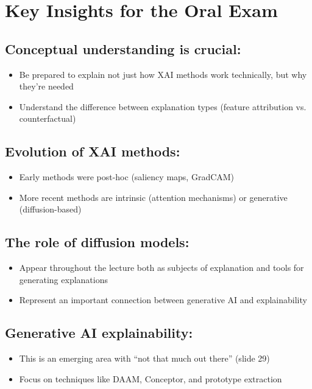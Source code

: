 \section*{Key Insights for the Oral Exam}

\subsection*{Conceptual understanding is crucial:}
\begin{itemize}
    \item Be prepared to explain not just how XAI methods work technically, but why they're needed
    \item Understand the difference between explanation types (feature attribution vs. counterfactual)
\end{itemize}

\subsection*{Evolution of XAI methods:}
\begin{itemize}
    \item Early methods were post-hoc (saliency maps, GradCAM)
    \item More recent methods are intrinsic (attention mechanisms) or generative (diffusion-based)
\end{itemize}

\subsection*{The role of diffusion models:}
\begin{itemize}
    \item Appear throughout the lecture both as subjects of explanation and tools for generating explanations
    \item Represent an important connection between generative AI and explainability
\end{itemize}

\subsection*{Generative AI explainability:}
\begin{itemize}
    \item This is an emerging area with ``not that much out there'' (slide 29)
    \item Focus on techniques like DAAM, Conceptor, and prototype extraction
\end{itemize}

